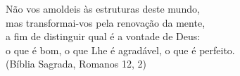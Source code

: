 \begin{epigrafe}
    \vspace*{\fill}
	\begin{flushright}
		Não vos amoldeis às estruturas deste mundo, \\
		mas transformai-vos pela renovação da mente, \\
		a fim de distinguir qual é a vontade de Deus: \\
		o que é bom, o que Lhe é agradável, o que é perfeito.\\
		(Bíblia Sagrada, Romanos 12, 2)
	\end{flushright}
\end{epigrafe}